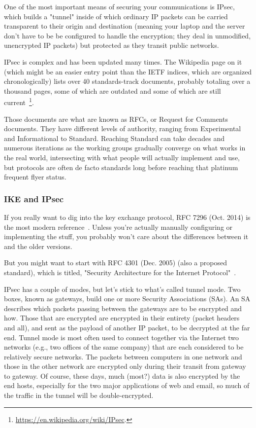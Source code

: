 One of the most important means of securing your communications is
IPsec, which builds a "tunnel" inside of which ordinary IP packets can
be carried transparent to their origin and destination (meaning your
laptop and the server don't have to be be configured to handle the
encryption; they deal in unmodified, unencrypted IP packets) but
protected as they transit public networks.

IPsec is complex and has been updated many times.  The Wikipedia page
on it (which might be an easier entry point than the IETF indices,
which are organized chronologically) lists over 40 standards-track
documents, probably totaling over a thousand pages, some of which are
outdated and some of which are still
current~\footnote{\url{https://en.wikipedia.org/wiki/IPsec}.}.

Those documents are what are known as RFCs, or Request for Comments
documents.  They have different levels of authority, ranging from
Experimental and Informational to Standard.  Reaching Standard can
take decades and numerous iterations as the working groups gradually
converge on what works in the real world, intersecting with what
people will actually implement and use, but protocols are often de
facto standards long before reaching that platinum frequent flyer
status.

\subsubsection{IKE and IPsec}

If you really want to dig into the key exchange protocol, RFC 7296
(Oct. 2014) is the most modern reference~\cite{RFC7296}.  Unless
you're actually manually configuring or implementing the stuff, you
probably won't care about the differences between it and the older
versions.

But you might want to start with RFC 4301 (Dec. 2005) (also a proposed
standard), which is titled, "Security Architecture for the Internet
Protocol"~\cite{RFC4301}.

IPsec has a couple of modes, but let's stick to what's called tunnel
mode.  Two boxes, known as gateways, build one or more Security
Associations (SAs). An SA describes which packets passing between the
gateways are to be encrypted and how.  Those that are encrypted are
encrypted in their entirety (packet headers and all), and sent as the
payload of another IP packet, to be decrypted at the far end.  Tunnel
mode is most often used to connect together via the Internet two
networks (e.g., two offices of the same company) that are each
considered to be relatively secure networks.  The packets between
computers in one network and those in the other network are encrypted
only during their transit from gateway to gateway.  Of course, these
days, much (most?) data is also encrypted by the end hosts, especially
for the two major applications of web and email, so much of the
traffic in the tunnel will be double-encrypted.

